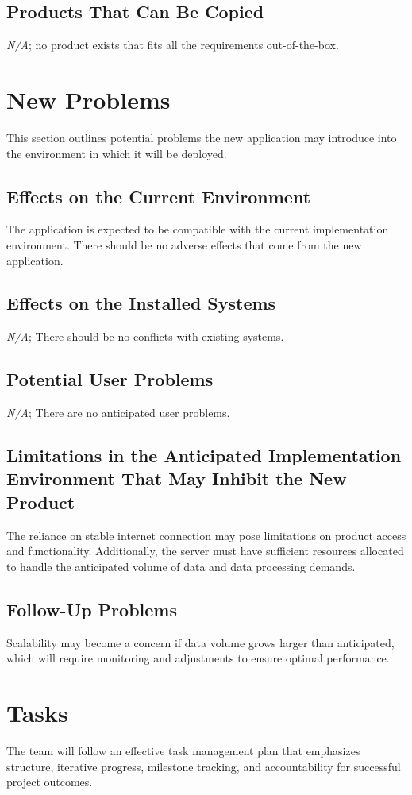 \documentclass[12pt]{article}
\begin{document}
\subsection{Products That Can Be Copied}
\emph{N/A}; no product exists that fits all the requirements out-of-the-box.

\section{New Problems}
This section outlines potential problems the new application may introduce into the  environment in which it will be deployed.
\subsection{Effects on the Current Environment}
The application is expected to be compatible with the current implementation environment. There should be no adverse effects that come from the new application.

\subsection{Effects on the Installed Systems}
\emph{N/A}; There should be no conflicts with existing systems.

\subsection{Potential User Problems}
\emph{N/A}; There are no anticipated user problems.

\subsection{Limitations in the Anticipated Implementation Environment That May
Inhibit the New Product}
The reliance on stable internet connection may pose limitations on product access and functionality. Additionally, the server must have sufficient resources allocated to handle the anticipated volume of data and data processing demands.

\subsection{Follow-Up Problems}
Scalability may become a concern if data volume grows larger than anticipated, which will require monitoring and adjustments to ensure optimal performance.

\section{Tasks}
The team will follow an effective task management plan that emphasizes
structure, iterative progress, milestone tracking, and accountability for
successful project outcomes. 
\end{document}
